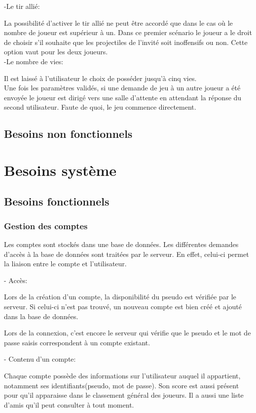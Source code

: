\documentclass[a4paper,12pt]{article}
\begin{document}
-Le tir allié: 

La possibilité d'activer le tir allié ne peut être accordé que dans le cas où le nombre de joueur est supérieur à un.
Dans ce premier scénario le joueur a le droit de choisir s'il souhaite que les projectiles de l'invité soit inoffensifs ou non. Cette option vaut pour les deux joueurs. \\

-Le nombre de vies: 

Il est laissé à l'utilisateur le choix de posséder jusqu'à cinq vies. \\

Une fois les paramètres validés, si une demande de jeu à un autre joueur a été envoyée le joueur est dirigé vers une salle d'attente en attendant la réponse du second utilisateur. Faute de quoi, le jeu commence directement.

\subsection{Besoins non fonctionnels}

\newpage

\section{Besoins système}
\subsection{Besoins fonctionnels}
\subsubsection{Gestion des comptes}
Les comptes sont stockés dans une base de données. Les différentes demandes d'accès à la base de données sont traitées par le serveur. En effet, celui-ci permet la liaison entre le compte et l'utilisateur.

- Accès:

Lors de la création d'un compte, la disponibilité du pseudo est vérifiée par le serveur. Si celui-ci n'est pas trouvé, un nouveau compte est bien créé et ajouté dans la base de données.

Lors de la connexion, c'est encore le serveur qui vérifie que le pseudo et le mot de passe saisis correspondent à un compte existant.

- Contenu d'un compte:

Chaque compte possède des informations sur l'utilisateur auquel il appartient, notamment ses identifiants(pseudo, mot de passe). Son score est aussi présent pour qu'il apparaisse dans le classement général des joueurs. Il a aussi une liste d'amis qu'il peut consulter à tout moment.
\end{document}
